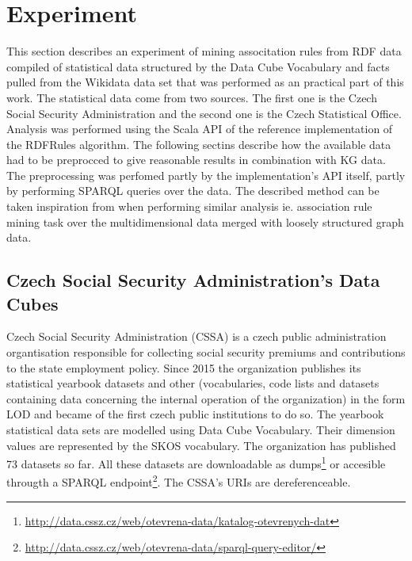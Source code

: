 \chapter{Experiment}


This section describes an experiment of mining associtation rules from RDF data compiled of statistical data structured by the Data Cube Vocabulary and facts pulled from the Wikidata data set that was performed as an practical part of this work. The statistical data come from two sources. The first one is the Czech Social Security Administration and the second one is the Czech Statistical Office. Analysis was performed using the Scala API of the reference implementation of the RDFRules algorithm. The following sectins describe how the available data had to be preprocced to give reasonable results in combination with KG data. The preprocessing was perfomed partly by the implementation's API itself, partly by performing SPARQL queries over the data. The described method can be taken inspiration from when performing similar analysis ie. association rule mining task over the multidimensional data merged with loosely structured graph data. 

\section{Czech Social Security Administration's Data Cubes}

Czech Social Security Administration (CSSA) is a czech public administration organtisation responsible for collecting social security premiums and contributions to the state employment policy. Since 2015 the organization publishes its statistical yearbook datasets and other (vocabularies, code lists and datasets containing data concerning the internal operation of the organization) in the form LOD and became of the first czech public institutions to do so. The yearbook statistical data sets are modelled using Data Cube Vocabulary. Their dimension values are represented by the SKOS vocabulary. The organization has published 73 datasets so far. All these datasets are downloadable as dumps\footnote{\href{http://data.cssz.cz/web/otevrena-data/katalog-otevrenych-dat}{http://data.cssz.cz/web/otevrena-data/katalog-otevrenych-dat}} or accesible througth a SPARQL endpoint\footnote{\href{http://data.cssz.cz/web/otevrena-data/sparql-query-editor/}{http://data.cssz.cz/web/otevrena-data/sparql-query-editor/}}. The CSSA's URIs are dereferenceable.

